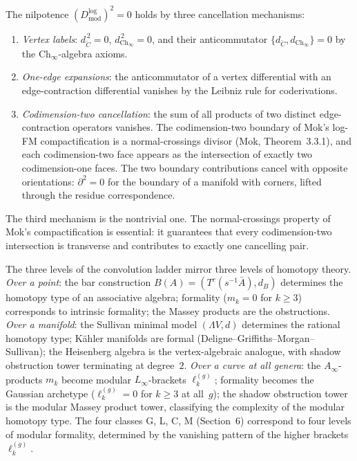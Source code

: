 The nilpotence $(D^{\log}_{\mathrm{mod}})^2=0$ holds by three
cancellation mechanisms:
\begin{enumerate}[label=(\roman*)]
\item \emph{Vertex labels}: $d_{\check C}^{\,2}=0$,
$d_{\mathrm{Ch}_\infty}^{\,2}=0$, and their anticommutator
$\{d_{\check C},d_{\mathrm{Ch}_\infty}\}=0$ by the
$\mathrm{Ch}_\infty$-algebra axioms.
\item \emph{One-edge expansions}: the anticommutator of a
vertex differential with an edge-contraction differential
vanishes by the Leibniz rule for coderivations.
\item \emph{Codimension-two cancellation}: the sum of all
products of two distinct edge-contraction operators vanishes.
The codimension-two boundary of
Mok's log-FM compactification is a normal-crossings divisor
(Mok, Theorem~3.3.1), and each codimension-two face appears as
the intersection of exactly two codimension-one faces. The
two boundary contributions cancel with opposite orientations:
$\partial^2=0$ for the boundary of a manifold with corners,
lifted through the residue correspondence.
\end{enumerate}
The third mechanism is the nontrivial one. The normal-crossings
property of Mok's compactification is essential: it guarantees
that every codimension-two intersection is transverse and
contributes to exactly one cancelling pair.

\begin{remark}
\label{rem:pref-homotopy-types}
The three levels of the convolution ladder mirror three levels of
homotopy theory. \emph{Over a point}: the bar construction
$B(A) = (T^c(s^{-1}\bar A), d_B)$ determines the homotopy type of
an associative algebra; formality ($m_k=0$ for $k \ge 3$)
corresponds to intrinsic formality; the Massey products are the
obstructions. \emph{Over a manifold}: the Sullivan minimal model
$(\Lambda V, d)$ determines the rational homotopy type; K\"ahler
manifolds are formal (Deligne--Griffiths--Morgan--Sullivan);
the Heisenberg algebra is the vertex-algebraic analogue, with
shadow obstruction tower terminating at degree~$2$.
\emph{Over a curve at all genera}: the $A_\infty$-products
$m_k$ become modular $L_\infty$-brackets
$\ell_k^{(g)}$; formality becomes the Gaussian archetype
($\ell_k^{(g)}=0$ for $k \ge 3$ at all~$g$); the shadow
obstruction tower is the modular Massey product tower, classifying
the complexity of the modular homotopy type.
The four classes G, L, C, M (Section~6) correspond to four levels
of modular formality, determined by the vanishing pattern of the
higher brackets~$\ell_k^{(g)}$.
\end{remark}


